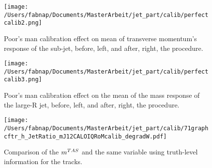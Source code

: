 \begin{figure}[!ht]
  \centering
      \texttt{[image: /Users/fabnap/Documents/MasterArbeit/jet\_part/calib/perfectcalib2.png]}
  \caption{Poor's man calibration effect on mean of transverse momentum's response of the sub-jet, before, left, and after, right, the procedure.}
  \label{fig:calibA}
\end{figure}

\begin{figure}[!ht]
  \centering
      \texttt{[image: /Users/fabnap/Documents/MasterArbeit/jet\_part/calib/perfectcalib3.png]}
  \caption{Poor's man calibration effect on the mean of the mass response of the large-R jet, before, left, and after, right, the procedure.}
  \label{fig:calibA2}
\end{figure}


\begin{figure}[!ht]
  \centering
      \texttt{[image: /Users/fabnap/Documents/MasterArbeit/jet\_part/calib/71graphcftr\_h\_JetRatio\_mJ12CALOIQRoMcalib\_degradW.pdf]}
  \caption{Comparison of the $m^{TAS}$ and the same variable using truth-level information for the tracks.}
  \label{fig:breakdown1}
\end{figure}